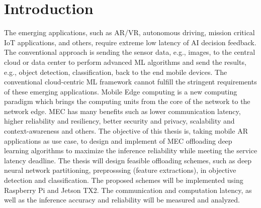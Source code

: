 \hypertarget{inroduction}{%
\chapter{Introduction}\label{sec:introduction}}
\thispagestyle{fancy}

The emerging applications, such as AR/VR, autonomous driving, mission critical IoT applications, and others, require extreme low latency of AI decision feedback. The conventional approach is sending the sensor data, e.g., images,
to the central cloud or data center to perform advanced ML algorithms and send the results, e.g., object detection, classification, back to the end mobile devices. The conventional cloud-centric ML framework cannot fulfill the stringent requirements of these emerging applications. Mobile Edge computing is a new computing paradigm which brings the computing units from the core of
the network to the network edge. MEC has many benefits such as lower communication latency, higher reliability and resiliency, better security and privacy, scalability and context-awareness and others. The objective of this thesis is, taking mobile AR applications as use case, to design and implement of MEC offloading deep learning algorithms to maximize the inference reliability while meeting the service latency deadline. The thesis will design feasible offloading schemes, such as deep neural network partitioning, preprosssing (feature extractions), in objective detection and classification. The proposed schemes will be implemented using Raspberry Pi and Jetson TX2. The communication and computation latency, as well as the inference accuracy and reliability will be measured and analyzed.

